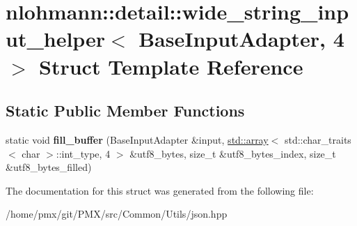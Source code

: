 \hypertarget{structnlohmann_1_1detail_1_1wide__string__input__helper_3_01BaseInputAdapter_00_014_01_4}{}\section{nlohmann\+:\+:detail\+:\+:wide\+\_\+string\+\_\+input\+\_\+helper$<$ Base\+Input\+Adapter, 4 $>$ Struct Template Reference}
\label{structnlohmann_1_1detail_1_1wide__string__input__helper_3_01BaseInputAdapter_00_014_01_4}
\subsection*{Static Public Member Functions}
\begin{DoxyCompactItemize}
\item 
\mbox{\label{structnlohmann_1_1detail_1_1wide__string__input__helper_3_01BaseInputAdapter_00_014_01_4_a0ff95d2f31684b6477abcd783975b7c1}} 
static void {\bfseries fill\+\_\+buffer} (Base\+Input\+Adapter \&input, \hyperlink{namespacenlohmann_1_1detail_a1ed8fc6239da25abcaf681d30ace4985af1f713c9e000f5d3f280adbd124df4f5}{std\+::array}$<$ std\+::char\+\_\+traits$<$ char $>$\+::int\+\_\+type, 4 $>$ \&utf8\+\_\+bytes, size\+\_\+t \&utf8\+\_\+bytes\+\_\+index, size\+\_\+t \&utf8\+\_\+bytes\+\_\+filled)
\end{DoxyCompactItemize}


The documentation for this struct was generated from the following file\+:\begin{DoxyCompactItemize}
\item 
/home/pmx/git/\+P\+M\+X/src/\+Common/\+Utils/json.\+hpp\end{DoxyCompactItemize}
